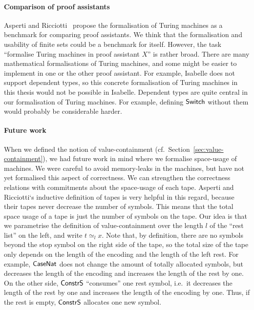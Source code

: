 \paragraph{Comparison of proof assistants}
Asperti and Ricciotti~\cite{asperti2015} propose the formalisation of Turing machines as a benchmark for comparing proof assistants.  We think that
the formalisation and usability of finite sets could be a benchmark for itself.  However, the task ``formalise Turing machines in proof assistant
$X$'' is rather broad.  There are many mathematical formalisations of Turing machines, and some might be easier to implement in one or the other proof
assistant.  For example, Isabelle does not support dependent types, so this concrete formalisation of Turing machines in this thesis would not be
possible in Isabelle.  Dependent types are quite central in our formalisation of Turing machines.  For example, defining $\mathsf{Switch}$ without them would
probably be considerable harder.



\paragraph{Future work}

\enlargethispage{0.5cm}

When we defined the notion of value-containment (cf.~Section~\ref{sec:value-containment}), we had future work in mind where we formalise space-usage
of machines.  We were careful to avoid memory-leaks in the machines, but have not yet formalised this aspect of correctness.  We can strengthen the
correctness relations with commitments about the space-usage of each tape.  Asperti and Ricciotti`s inductive definition of tapes is very helpful in
this regard, because their tapes never decrease the number of symbols.  This means that the total space usage of a tape is just the number of symbols
on the tape.  Our idea is that we parametrise the definition of value-containment over the length $l$ of the ``rest list'' on the left, and write
$t \simeq_{l} x$.  Note that, by definition, there are no symbols beyond the stop symbol on the right side of the tape, so the total size of the tape
only depends on the length of the encoding and the length of the left rest.  For example, $\mathsf{CaseNat}$ does not change the amount of totally
allocated symbols, but decreases the length of the encoding and increases the length of the rest by one.  On the other side, $\mathsf{ConstrS}$
``consumes'' one rest symbol, i.e.\ it decreases the length of the rest by one and increases the length of the encoding by one.  Thus, if the rest is
empty, $\mathsf{ConstrS}$ allocates one new symbol.

